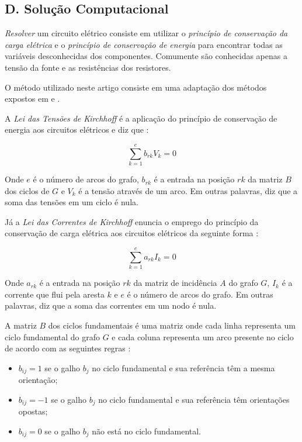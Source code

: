 \documentclass[twocolumn, 10pt]{extarticle}
\begin{document}
\subsection*{D. \quad Solução Computacional}

\textit{Resolver} um circuito elétrico consiste em utilizar o \textit{princípio de conservação da carga elétrica} e o \textit{princípio de conservação de energia} para encontrar todas as variáveis desconhecidas dos componentes. Comumente são conhecidas apenas a tensão da fonte e as resistências dos resistores.

O método utilizado neste artigo consiste em uma adaptação dos métodos expostos em \cite{krishna} e \cite{boruah}.

A \textit{Lei das Tensões de Kirchhoff} é a aplicação do princípio de conservação de energia aos circuitos elétricos e diz que \cite[p. 945]{boruah}:

\[
\sum_{k=1}^{e} b_{rk}V_k = 0
\]

Onde $e$ é o número de arcos do grafo, $b_{rk}$ é a entrada na posição $rk$ da matriz $B$ dos ciclos de $G$ e $V_k$ é a tensão através de um arco. Em outras palavras, diz que a soma das tensões em um ciclo é nula.

Já a \textit{Lei das Correntes de Kirchhoff} enuncia o emprego do princípio da conservação de carga elétrica aos circuitos elétricos da seguinte forma \cite[p. 945]{boruah}:

\[
\sum_{k=1}^{e} a_{rk}I_k = 0
\]

Onde $a_{rk}$ é a entrada na posição $rk$ da matriz de incidência $A$ do grafo $G$, $I_k$ é a corrente que flui pela aresta $k$ e $e$ é o número de arcos do grafo. Em outras palavras, diz que a soma das correntes em um nodo é nula.

A matriz $B$ dos ciclos fundamentais é uma matriz onde cada linha representa um ciclo fundamental do grafo $G$ e cada coluna representa um arco presente no ciclo de acordo com as seguintes regras \cite[p. 948]{boruah}:

\begin{itemize}
	\item $b_{ij} = 1$ se o galho $b_j$ no ciclo fundamental e sua referência têm a mesma orientação;
	\item $b_{ij} = -1$ se o galho $b_j$ no ciclo fundamental e sua referência têm orientações opostas;
	\item $b_{ij} = 0$ se o galho $b_j$ não está no ciclo fundamental.
\end{itemize}
\end{document}
